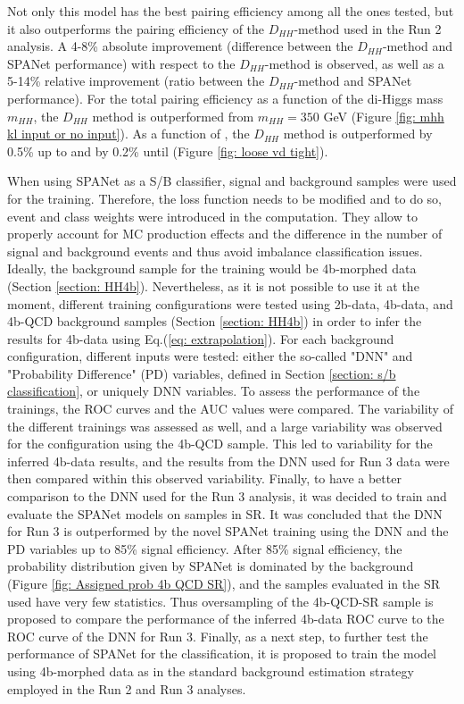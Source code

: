 \noindent Not only this model has the best pairing efficiency among all the ones tested, but it also outperforms the pairing efficiency of the $D_{HH}$-method used in the Run 2 analysis. A 4-8\% absolute improvement (difference between the $D_{HH}$-method and SPANet performance) with respect to
the $D_{HH}$-method is observed, as well as a 5-14\% relative improvement (ratio between the $D_{HH}$-method and SPANet performance). For the total pairing efficiency as a function of the di-Higgs mass $m_{HH}$, the $D_{HH}$ method is outperformed from $m_{HH}=350$ GeV (Figure \ref{fig: mhh kl input or no input}). As a function of \kl, the $D_{HH}$ method is outperformed by 0.5\% up to  and by 0.2\% until  (Figure \ref{fig: loose vd tight}).

\vspace{0.2 cm}

When using SPANet as a S/B classifier, signal and background samples were used for the training. Therefore, the loss function needs to be modified and to do so, event and class weights were introduced in the computation. They allow to properly account for MC production effects and the difference in the number of signal and background events and thus avoid imbalance classification issues. Ideally, the background sample for the training would be 4b-morphed data (Section \ref{section: HH4b}). Nevertheless, as it is not possible to use it at the moment, different training configurations were tested using 2b-data, 4b-data, and 4b-QCD background samples (Section \ref{section: HH4b}) in order to infer the results for 4b-data using Eq.(\ref{eq: extrapolation}). For each background configuration, different inputs were tested: either the so-called "DNN" and "Probability Difference" (PD) variables, defined in Section \ref{section: s/b classification}, or uniquely DNN variables.  To assess the performance of the trainings, the ROC curves and the AUC values were compared. The variability of the different trainings was assessed as well, and a large variability was observed for the configuration using the 4b-QCD sample. This led to variability for the inferred 4b-data results, and the results from the DNN used for Run 3 data were then compared within this observed variability. Finally, to have a better comparison to the DNN used for the Run 3 analysis, it was decided to train and evaluate the SPANet models on samples in SR. It was concluded that the DNN for Run 3 is outperformed by the novel SPANet training using the DNN and the PD variables up to 85\% signal efficiency. After 85\% signal efficiency, the probability distribution given by SPANet is dominated by the background (Figure \ref{fig: Assigned prob 4b QCD SR}), and the samples evaluated in the SR used have very few statistics. Thus oversampling of the 4b-QCD-SR sample is proposed to compare the performance of the inferred 4b-data ROC curve to the ROC curve of the DNN for Run 3. Finally, as a next step, to further test the performance of SPANet for the classification, it is proposed to train the model using 4b-morphed data as in the standard background estimation strategy employed in the Run 2 and Run 3 analyses. 